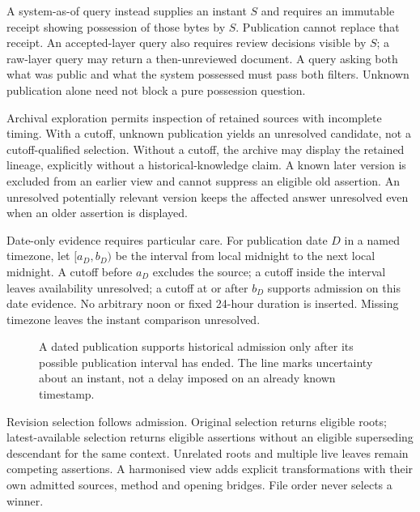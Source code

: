 A system-as-of query instead supplies an instant $S$ and requires an immutable
receipt showing possession of those bytes by $S$. Publication cannot replace
that receipt. An accepted-layer query also requires review decisions visible
by $S$; a raw-layer query may return a then-unreviewed document. A query asking
both what was public and what the system possessed must pass both filters.
Unknown publication alone need not block a pure possession question.

Archival exploration permits inspection of retained sources with incomplete
timing. With a cutoff, unknown publication yields an unresolved candidate,
not a cutoff-qualified selection. Without a cutoff, the archive may display
the retained lineage, explicitly without a historical-knowledge claim. A known
later version is excluded from an earlier view and cannot suppress an eligible
old assertion. An unresolved potentially relevant version keeps the affected
answer unresolved even when an older assertion is displayed.

Date-only evidence requires particular care. For publication date $D$ in a
named timezone, let $[a_D,b_D)$ be the interval from local midnight to the next
local midnight. A cutoff before $a_D$ excludes the source; a cutoff inside the
interval leaves availability unresolved; a cutoff at or after $b_D$ supports
admission on this date evidence. No arbitrary noon or fixed 24-hour duration
is inserted. Missing timezone leaves the instant comparison unresolved.

\begin{figure}[htbp]
\centering
{}
\caption{A dated publication supports historical admission only after its
possible publication interval has ended. The line marks uncertainty about an
instant, not a delay imposed on an already known timestamp.}
\end{figure}

Revision selection follows admission. Original selection returns eligible
roots; latest-available selection returns eligible assertions without an
eligible superseding descendant for the same context. Unrelated roots and
multiple live leaves remain competing assertions. A harmonised view adds
explicit transformations with their own admitted sources, method and opening
bridges. File order never selects a winner.

